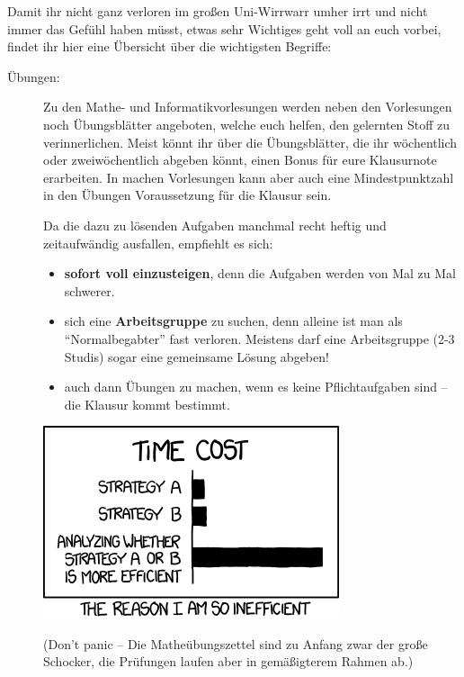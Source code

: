 Damit ihr nicht ganz verloren im gro\ss en Uni-Wirrwarr umher irrt und
  nicht immer das Gefühl haben müsst, etwas sehr Wichtiges geht
  voll an euch vorbei, findet ihr hier eine Übersicht über die wichtigsten Begriffe:

\begin{description}

\item [Übungen:] Zu den Mathe- und Informatikvorlesungen werden neben den Vorlesungen noch Übungsblätter angeboten, welche euch helfen, den gelernten Stoff zu verinnerlichen. Meist könnt ihr über die Übungsblätter, die ihr wöchentlich oder zweiwöchentlich abgeben könnt, einen Bonus für eure Klausurnote erarbeiten. In machen Vorlesungen kann aber auch eine Mindestpunktzahl in den Übungen Voraussetzung für die Klausur sein.

Da die dazu zu lösenden Aufgaben manchmal recht heftig und zeitaufwändig ausfallen, empfiehlt es sich:

\begin{itemize}

\item \textbf{sofort voll einzusteigen}, denn die Aufgaben werden von Mal
  zu Mal schwerer.

\item sich eine \textbf{Arbeitsgruppe} zu suchen, denn alleine ist man
  als "`Normalbegabter"' fast verloren. Meistens darf eine
  Arbeitsgruppe (2-3 Studis) sogar eine gemeinsame Lösung abgeben!

\item auch dann Übungen zu machen, wenn es keine Pflichtaufgaben sind --
  die Klausur kommt bestimmt.

\end {itemize}

\begin{center}
\includegraphics[width=0.5\hsize]{info/xkcd/efficiency.png}
\end{center}


(Don't panic -- Die Matheübungszettel sind zu Anfang zwar der gro\ss e
  Schocker, die Prüfungen laufen aber in gemä\ss igterem Rahmen ab.)


\end{description}
